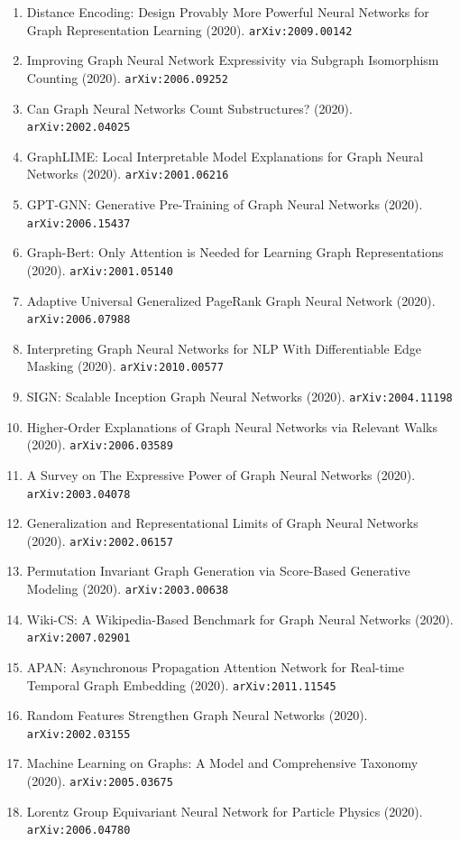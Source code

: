 \documentclass[11pt]{article}
\begin{document}
\begin{enumerate}
  \item Distance Encoding: Design Provably More Powerful Neural Networks for
  Graph Representation Learning (2020). \texttt{arXiv:2009.00142}
  \item Improving Graph Neural Network Expressivity via Subgraph Isomorphism
  Counting (2020). \texttt{arXiv:2006.09252}
  \item Can Graph Neural Networks Count Substructures? (2020). \texttt{arXiv:2002.04025}
  \item GraphLIME: Local Interpretable Model Explanations for Graph Neural
  Networks (2020). \texttt{arXiv:2001.06216}
  \item GPT-GNN: Generative Pre-Training of Graph Neural Networks (2020). \texttt{arXiv:2006.15437}
  \item Graph-Bert: Only Attention is Needed for Learning Graph Representations (2020). \texttt{arXiv:2001.05140}
  \item Adaptive Universal Generalized PageRank Graph Neural Network (2020). \texttt{arXiv:2006.07988}
  \item Interpreting Graph Neural Networks for NLP With Differentiable Edge
  Masking (2020). \texttt{arXiv:2010.00577}
  \item SIGN: Scalable Inception Graph Neural Networks (2020). \texttt{arXiv:2004.11198}
  \item Higher-Order Explanations of Graph Neural Networks via Relevant Walks (2020). \texttt{arXiv:2006.03589}
  \item A Survey on The Expressive Power of Graph Neural Networks (2020). \texttt{arXiv:2003.04078}
  \item Generalization and Representational Limits of Graph Neural Networks (2020). \texttt{arXiv:2002.06157}
  \item Permutation Invariant Graph Generation via Score-Based Generative
  Modeling (2020). \texttt{arXiv:2003.00638}
  \item Wiki-CS: A Wikipedia-Based Benchmark for Graph Neural Networks (2020). \texttt{arXiv:2007.02901}
  \item APAN: Asynchronous Propagation Attention Network for Real-time Temporal
  Graph Embedding (2020). \texttt{arXiv:2011.11545}
  \item Random Features Strengthen Graph Neural Networks (2020). \texttt{arXiv:2002.03155}
  \item Machine Learning on Graphs: A Model and Comprehensive Taxonomy (2020). \texttt{arXiv:2005.03675}
  \item Lorentz Group Equivariant Neural Network for Particle Physics (2020). \texttt{arXiv:2006.04780}

\end{enumerate}
\end{document}
